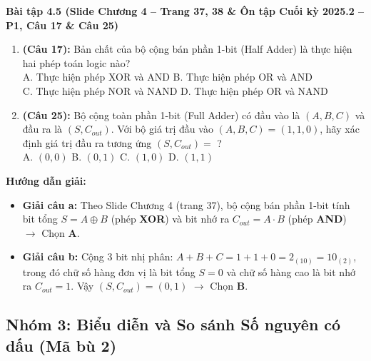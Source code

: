 \textbf{Bài tập 4.5 (Slide Chương 4 -- Trang 37, 38 \& Ôn tập Cuối kỳ 2025.2 -- P1, Câu 17 \& Câu 25)}
\begin{enumerate}[label=\alph*)]
    \item \textbf{(Câu 17):} Bản chất của bộ cộng bán phần 1-bit (Half Adder) là thực hiện hai phép toán logic nào?\\
    A. Thực hiện phép XOR và AND \qquad B. Thực hiện phép OR và AND\\
    C. Thực hiện phép NOR và NAND \qquad D. Thực hiện phép OR và NAND
    \item \textbf{(Câu 25):} Bộ cộng toàn phần 1-bit (Full Adder) có đầu vào là $(A, B, C)$ và đầu ra là $(S, C_{out})$. Với bộ giá trị đầu vào $(A, B, C) = (1, 1, 0)$, hãy xác định giá trị đầu ra tương ứng $(S, C_{out}) =$ ?\\
    A. $(0, 0)$ \qquad B. $(0, 1)$ \qquad C. $(1, 0)$ \qquad D. $(1, 1)$
\end{enumerate}
\textbf{Hướng dẫn giải:}
\begin{itemize}
    \item \textbf{Giải câu a:} Theo Slide Chương 4 (trang 37), bộ cộng bán phần 1-bit tính bit tổng $S = A \oplus B$ (phép \textbf{XOR}) và bit nhớ ra $C_{out} = A \cdot B$ (phép \textbf{AND}) $\rightarrow$ Chọn \textbf{A}.
    \item \textbf{Giải câu b:} Cộng 3 bit nhị phân: $A + B + C = 1 + 1 + 0 = 2_{(10)} = 10_{(2)}$, trong đó chữ số hàng đơn vị là bit tổng $S = 0$ và chữ số hàng cao là bit nhớ ra $C_{out} = 1$. Vậy $(S, C_{out}) = (0, 1)$ $\rightarrow$ Chọn \textbf{B}.
\end{itemize}

\subsection{Nhóm 3: Biểu diễn và So sánh Số nguyên có dấu (Mã bù 2)}

